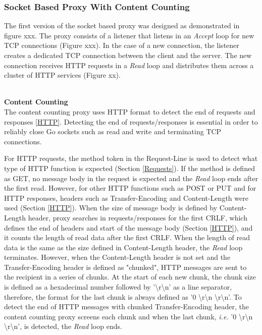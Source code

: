 \documentclass[a4paper,11pt,twoside]{article}
\begin{document}
\subsubsection{Socket Based Proxy With Content Counting}\label{Content-Counting}
The first version of the socket based proxy was designed as demonstrated in figure xxx. The proxy consists of a listener that listens in an  \textit{Accept} loop for new TCP connections (Figure xxx). In the case of a new connection, the listener creates a dedicated TCP connection between the client and the server. The new connection receives HTTP requests in a  \textit{Read} loop and distributes them across a cluster of HTTP services (Figure xx).  

\noindent\\
\textbf{Content Counting}\\
The content counting proxy uses HTTP format to detect the end of requests and responses \ref{HTTP}. Detecting the end of requests/responses is essential in order to reliably close Go sockets such as read and write and terminating TCP connections. 

For HTTP requests, the method token in the Request-Line is used to detect what type of HTTP function is expected (Section \ref{Requests}). If the method is defined as GET, no message body in the request is expected and the  \textit{Read} loop ends after the first read. However, for other HTTP functions such as POST or PUT and for HTTP responses, headers such as Transfer-Encoding and Content-Length were used (Section \ref{HTTP}). When the size of message body is defined by Content-Length header, proxy searches  in requests/responses for the first CRLF, which defines the end of headers and start of the message body (Section \ref{HTTP}), and it counts the length of read data after the first CRLF. When the length of read data is the same as the size defined in Content-Length header, the \textit{Read} loop terminates. However, when the Content-Length header is not set and the Transfer-Encoding header is defined as "chunked", HTTP messages are sent to the recipient in a series of chunks. At the start of each new chunk, the chunk size is defined as a hexadecimal number followed by '\textbackslash r\textbackslash n' as a line separator, therefore, the format for the last chunk is always defined as '0 \textbackslash r\textbackslash n \textbackslash r\textbackslash n'. To detect the end of HTTP messages with chunked Transfer-Encoding header, the content counting proxy screens each chunk and when the last chunk, \textit{i.e.} '0 \textbackslash r\textbackslash n \textbackslash r\textbackslash n', is detected, the  \textit{Read} loop ends. 
\end{document}
